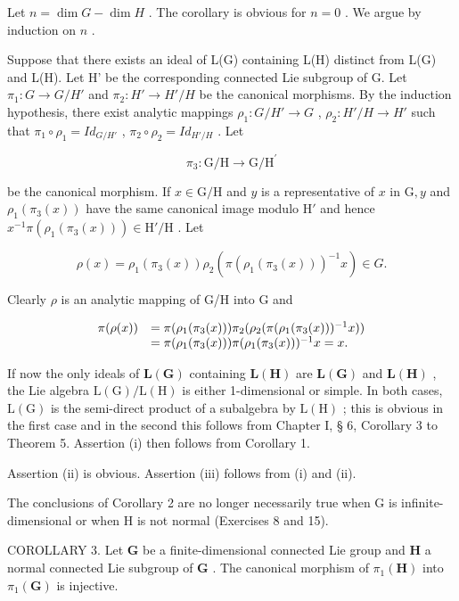 Let \(n = \dim G - \dim H\) . The corollary is obvious for \(n = 0\) . We argue by induction on \(n\) .

Suppose that there exists an ideal of L(G) containing L(H) distinct from L(G) and L(H). Let H' be the corresponding connected Lie subgroup of G. Let \(\pi_{1}: G \to G/H'\) and \(\pi_{2}: H' \to H'/H\) be the canonical morphisms. By the induction hypothesis, there exist analytic mappings \(\rho_{1}: G/H' \to G\) , \(\rho_{2}: H'/H \to H'\) such that \(\pi_{1} \circ \rho_{1} = Id_{G/H'}\) , \(\pi_{2} \circ \rho_{2} = Id_{H'/H}\) . Let

\[
\pi_ {3} \colon \mathrm{G} / \mathrm{H} \rightarrow \mathrm{G} / \mathrm{H} ^ {\prime}
\]

be the canonical morphism. If \(x \in \mathrm{G} / \mathrm{H}\) and \(y\) is a representative of \(x\) in \(\mathrm{G}, y\) and \(\rho_1(\pi_3(x))\) have the same canonical image modulo \(\mathrm{H}'\) and hence \(x^{-1}\pi (\rho_1(\pi_3(x))) \in \mathrm{H}' / \mathrm{H}\) . Let

\[
\rho (x) = \rho_ {1} (\pi_ {3} (x)) \rho_ {2} (\pi (\rho_ {1} (\pi_ {3} (x))) ^ {- 1} x) \in G.
\]

Clearly \(\rho\) is an analytic mapping of G/H into G and

\[
\begin{array}{r l} \pi (\rho (x)) & = \pi (\rho_ {1} (\pi_ {3} (x))) \pi_ {2} (\rho_ {2} (\pi (\rho_ {1} (\pi_ {3} (x))) ^ {- 1} x)) \\ & = \pi (\rho_ {1} (\pi_ {3} (x))) \pi (\rho_ {1} (\pi_ {3} (x))) ^ {- 1} x = x. \end{array}
\]

If now the only ideals of \(\mathbf{L}(\mathbf{G})\) containing \(\mathbf{L}(\mathbf{H})\) are \(\mathbf{L}(\mathbf{G})\) and \(\mathbf{L}(\mathbf{H})\) , the Lie algebra \(\mathrm{L(G) / L(H)}\) is either 1-dimensional or simple. In both cases, \(\mathrm{L(G)}\) is the semi-direct product of a subalgebra by \(\mathrm{L(H)}\) ; this is obvious in the first case and in the second this follows from Chapter I, § 6, Corollary 3 to Theorem 5. Assertion (i) then follows from Corollary 1.

Assertion (ii) is obvious. Assertion (iii) follows from (i) and (ii).

The conclusions of Corollary 2 are no longer necessarily true when G is infinite-dimensional or when H is not normal (Exercises 8 and 15).

COROLLARY 3. Let \(\mathbf{G}\) be a finite-dimensional connected Lie group and \(\mathbf{H}\) a normal connected Lie subgroup of \(\mathbf{G}\) . The canonical morphism of \(\pi_1(\mathbf{H})\) into \(\pi_1(\mathbf{G})\) is injective.

